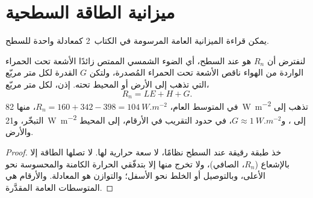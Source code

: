\section{ميزانية الطاقة السطحية}\label{sec:b1:radiation-heat-transport:surface}

يمكن قراءة الميزانية العامة المرسومة في الكتاب~2 كمعادلة واحدة للسطح.

\begin{proposition}\label{prop:b1:radiation-heat-transport:surface}
لنفترض أن $R_n$ هو  عند السطح، أي الضوء الشمسي الممتص زائدًا الأشعة تحت الحمراء الواردة من الهواء ناقص الأشعة تحت الحمراء المُصدرة، ولتكن $G$ القدرة لكل متر مربّع التي تذهب إلى الأرض أو المحيط تحته. إذن، لكل متر مربّع،
\[
  R_n = LE + H + G .
\]
في المتوسط العام، $R_n = 160 + 342 - 398 = \qty{104}{W.m^{-2}}$، منها \qty{82}{W.m^{-2}} تذهب إلى التبخّر، و\qty{21}{W.m^{-2}} إلى ، و$G \approx \qty{1}{W.m^{-2}}$، في حدود التقريب في الأرقام، إلى المحيط والأرض.
\end{proposition}

\begin{proof}
خذ طبقة رقيقة عند السطح نظامًا، لا سعة حرارية لها. لا تصلها الطاقة إلا بالإشعاع ($R_n$، الصافي)، ولا تخرج منها إلا بتدفّقي الحرارة الكامنة والمحسوسة نحو الأعلى، وبالتوصيل أو الخلط نحو الأسفل؛ والتوازن هو المعادلة. والأرقام هي المتوسطات العامة المقدَّرة.
\end{proof}

